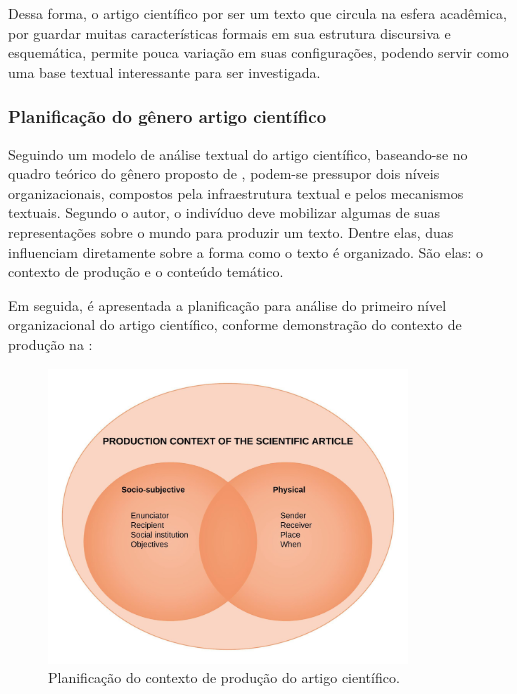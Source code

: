 \documentclass[portuguese]{textolivre}
\begin{document}
Dessa forma, o artigo científico por ser um texto que circula na esfera acadêmica, por guardar muitas características formais em sua estrutura discursiva e esquemática, permite pouca variação em suas configurações, podendo servir como uma base textual interessante para ser investigada.

\subsubsection{Planificação do gênero artigo científico}\label{sec-organizacao}
Seguindo um modelo de análise textual do artigo científico, baseando-se no quadro teórico do gênero proposto de \textcite{bronckart_atividade_1999}, podem-se pressupor dois níveis organizacionais, compostos pela infraestrutura textual e pelos mecanismos textuais. Segundo o autor, o indivíduo deve mobilizar algumas de suas representações sobre o mundo para produzir um texto. Dentre elas, duas influenciam diretamente sobre a forma como o texto é organizado. São elas: o contexto de produção e o conteúdo temático.

Em seguida, é apresentada a planificação para análise do primeiro nível organizacional do artigo científico, conforme demonstração do contexto de produção na :

\begin{figure}[htbp]
 \centering
 \includegraphics[width=0.85\textwidth]{Fig1.png}
 \caption{Planificação do contexto de produção do artigo científico.}
 \label{fig-01}
\end{figure}
\end{document}
